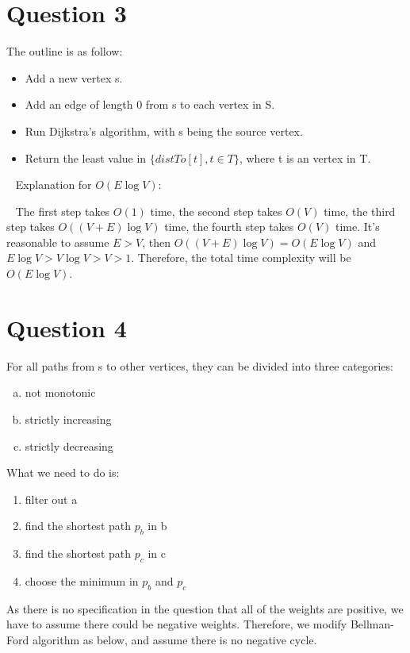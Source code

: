 \documentclass[11pt]{article}
\begin{document}
\section{Question 3}
The outline is as follow:
\begin{itemize}
\item Add a new vertex s. 
\item Add an edge of length 0 from s to each vertex in S.
\item Run Dijkstra's algorithm, with s being the source vertex.
\item Return the least value in $\{distTo[t], t \in T\}$, where t is an vertex in T.
\end{itemize}

~\newline\noindent
Explanation for $O(E \log V)$:

~\newline\noindent
The first step takes $O(1)$ time, the second step takes $O(V)$ time, the third step takes $O((V+E)\log V)$ time, the fourth step takes $O(V)$ time. It's reasonable to assume $E > V$, then $O((V+E)\log V) = O(E \log V)$ and $E \log V > V \log V > V > 1$. Therefore, the total time complexity will be  $O(E \log V)$.

\section{Question 4}
For all paths from s to other vertices, they can be divided into three categories: 
\begin{enumerate}[a)]
\item not monotonic 
\item strictly increasing
\item strictly decreasing
\end{enumerate}
What we need to do is:
\begin{enumerate}
\item filter out a
\item find the shortest path $p_b$ in b
\item find the shortest path $p_c$ in c
\item choose the minimum in $p_b$ and $p_c$
\end{enumerate}
As there is no specification in the question that all of the weights are positive, we have to assume there could be negative weights. Therefore, we modify Bellman-Ford algorithm as below, and assume there is no negative cycle.
\end{document}
